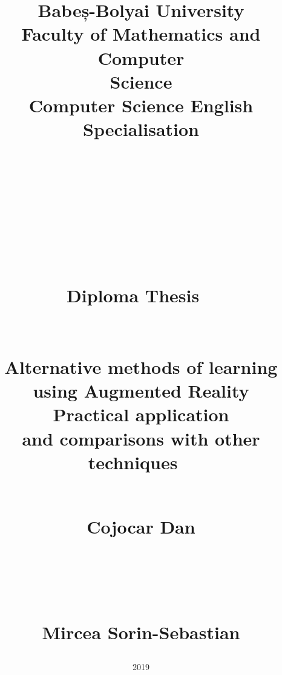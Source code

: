 \documentclass[12 pct]{report}
\begin{document}
\begin{titlepage}
\title{\vspace{-3.0cm}
  { \huge Babeș-Bolyai University\\
  Faculty of Mathematics and Computer\\
  Science\\
  Computer Science English Specialisation \\
  }
  \ \\
  \ \\
  \ \\
  \ \\
  \ \\
  \ \\
  {\huge Diploma Thesis}
  \ \\
  \ \\
  \ \\
  Alternative methods of learning using Augmented Reality\\
  Practical application \\
    and comparisons with other techniques
  \ \\
  \ \\
  {%
    \begin{flushleft}%
  	 Cojocar Dan
  	\end{flushleft}}
  \ \\
  \ \\
  {%
  \begin{flushright}
  	Mircea Sorin-Sebastian
  \end{flushright} }
}%
\date{2019\\}
\maketitle
\end{titlepage}
\end{document}
